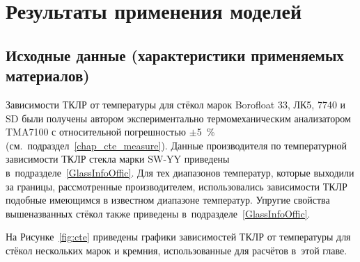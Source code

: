 \section{Результаты применения моделей}

\subsection{Исходные данные (характеристики применяемых материалов)}\label{chap_source_data}

Зависимости ТКЛР от температуры для стёкол марок Borofloat 33, ЛК5,
7740 и SD были получены автором экспериментально
термомеханическим анализатором TMA7100 с относительной погрешностью
${\pm}$5~\% (см.~подраздел~\ref{chap_cte_measure}). Данные
производителя по температурной зависимости ТКЛР стекла марки SW\nb-YY
приведены в~подразделе~\ref{GlassInfoOffic}. Для тех диапазонов
температур, которые выходили за границы, рассмотренные производителем,
использовались зависимости ТКЛР подобные имеющимся в известном
диапазоне температур. Упругие свойства вышеназванных стёкол также
приведены в~подразделе~\ref{GlassInfoOffic}.

На Рисунке~\ref{fig:cte}
приведены графики зависимостей ТКЛР от температуры для стёкол нескольких марок и кремния, использованные для расчётов в~этой главе.

